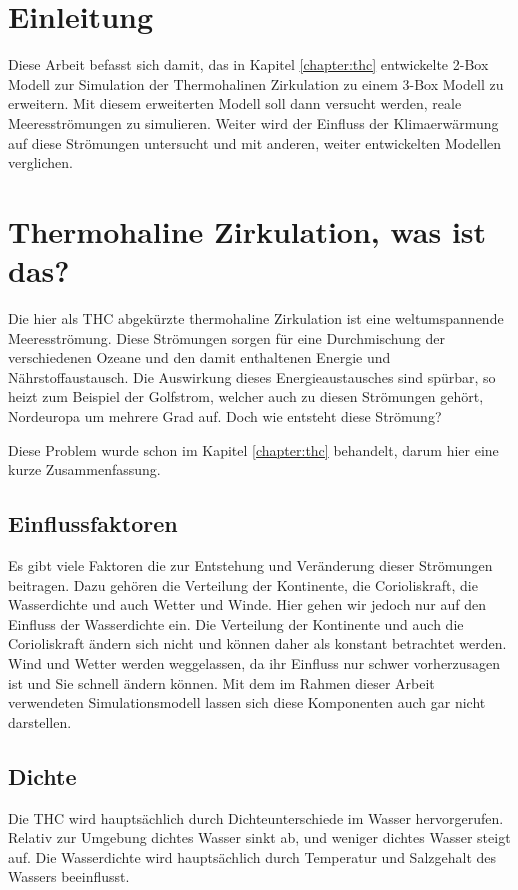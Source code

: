 \section{Einleitung}

Diese Arbeit befasst sich damit, das in Kapitel \ref{chapter:thc} entwickelte 2-Box Modell zur Simulation der Thermohalinen Zirkulation zu einem 3-Box Modell zu erweitern. Mit diesem erweiterten Modell soll dann versucht werden, reale Meeresströmungen zu simulieren. Weiter wird der Einfluss der Klimaerwärmung auf diese Strömungen untersucht und mit anderen, weiter entwickelten Modellen verglichen.

\section{Thermohaline Zirkulation, was ist das?}

Die hier als THC abgekürzte thermohaline Zirkulation ist eine weltumspannende Meeresströmung.
Diese Strömungen sorgen für eine Durchmischung der verschiedenen Ozeane und den damit enthaltenen Energie und Nährstoffaustausch. 
Die Auswirkung dieses Energieaustausches sind spürbar, so heizt zum Beispiel der Golfstrom, welcher auch zu diesen Strömungen gehört, Nordeuropa um mehrere Grad auf.
Doch wie entsteht diese Strömung? 

Diese Problem wurde schon im Kapitel \ref{chapter:thc} behandelt, darum hier eine kurze Zusammenfassung. 



\subsection{Einflussfaktoren}
Es gibt viele Faktoren die zur Entstehung und Veränderung dieser Strömungen beitragen. Dazu gehören die Verteilung der Kontinente, die Corioliskraft, die Wasserdichte und auch Wetter und Winde. Hier gehen wir jedoch nur auf den Einfluss der Wasserdichte ein.
Die Verteilung der Kontinente und auch die Corioliskraft ändern sich nicht und können daher als konstant betrachtet werden. Wind und Wetter werden weggelassen, da ihr Einfluss nur schwer vorherzusagen ist und Sie schnell ändern können. Mit dem im Rahmen dieser Arbeit verwendeten Simulationsmodell lassen sich diese Komponenten auch gar nicht darstellen.

\subsection{Dichte}
Die THC wird hauptsächlich durch Dichteunterschiede im Wasser hervorgerufen.
Relativ zur Umgebung dichtes Wasser sinkt ab, und weniger dichtes Wasser steigt auf. Die Wasserdichte wird hauptsächlich durch Temperatur und Salzgehalt des Wassers beeinflusst.

